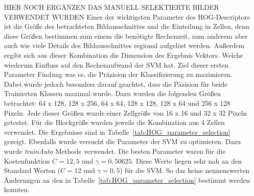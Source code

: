 HIER NOCH ERGÄNZEN DAS MANUELL SELEKTIERTE BILDER VERWENDET WURDEN
Einer der wichtigsten Parameter des HOG-Descriptors ist die Größe des betrachteten Bildausschnittes und die Einteilung in Zellen, denn diese Größen bestimmen zum einem die benötigte Rechenzeit, zum anderem aber auch wie viele Details des Bildausschnittes regional aufgelöst werden. Außerdem ergibt sich aus dieser Kombination die Dimension des Ergebnis Vektors. Welche wiederum Einfluss auf den Rechenaufwand der SVM hat. Ziel dieser ersten Parameter Findung was es, die Präzision der Klassifizierung zu maximieren. Dabei wurde jedoch besonders darauf geachtet, dass die Päzision für beide Trainierten Klassen maximal wurde. Dazu wurden die folgenden Größen betrachtet: 64 x 128, 128  x 256, 64 x 64, 128 x 128, 128 x 64 und 256 x 128 Pixeln. Jede dieser Größen wurde einer Zellgröße von 16 x 16 und 32 x 32 Pixeln getestet. Für die Blockgröße wurden jeweils die Kombination aus 4 Zellen verwendet. Die Ergebnisse sind in Tabelle~\ref{tab:HOG_parameter_selection} gezeigt.  
Ebenfalls wurde versucht die Parameter der SVM zu optimieren. Dazu wurde \textit{trainAuto} Methode verwendet. Die besten Parameter waren für die Kostenfunktion $C=12,5$ und $\gamma=0,50625$. Diese Werte liegen sehr nah an den Standard Werten ($C=12$ und $\gamma=0,5$) für die SVM. So das keine nennenswerten Änderungen an den in Tabelle~\ref{tab:HOG_parameter_selection} bestimmt werden konnten.


